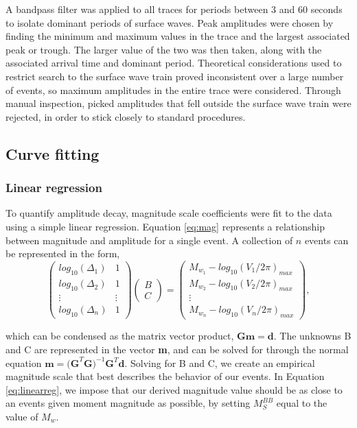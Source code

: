 \documentclass{gji}
\begin{document}
A bandpass filter was applied to all traces for periods between 3 and 60 seconds to isolate dominant periods of surface waves. Peak amplitudes were chosen by finding the minimum and maximum values in the trace and the largest associated peak or trough. The larger value of the two was then taken, along with the associated arrival time and dominant period. Theoretical considerations used to restrict search to the surface wave train proved inconsistent over a large number of events, so maximum amplitudes in the entire trace were considered. Through manual inspection, picked amplitudes that fell outside the surface wave train were rejected, in order to stick closely to standard procedures.

\subsection{Curve fitting}
\subsubsection{Linear regression}
To quantify amplitude decay, magnitude scale coefficients were fit to the data using a simple linear regression. Equation \ref{eq:mag} represents a relationship between magnitude and amplitude for a single event. A collection of $n$ events can be represented in the form, 
\begin{equation}
	\begin{pmatrix}
		log_{10}(\Delta_{1}) & 1 \\
		log_{10}(\Delta_{2}) & 1 \\
		\vdots  & \vdots \\
		log_{10}(\Delta_{n}) & 1 
	\end{pmatrix}
	\begin{pmatrix}
		{B}\\
		{C}
	\end{pmatrix}
	=
	\begin{pmatrix}
		M_{w_1} - log_{10}({V_1}/{2\pi})_{max} \\
		M_{w_2} - log_{10}({V_2}/{2\pi})_{max} \\
		\vdots  \\
		M_{w_n} - log_{10}({V_n}/{2\pi})_{max}
	\end{pmatrix},
	\label{eq:linearreg}
\end{equation}

\noindent which can be condensed as the matrix vector product, $\mathbf{Gm = d}$. The unknowns B and C are represented in the vector {\bfseries m}, and can be solved for through the normal equation $\mathbf{m} = \mathbf{(G}^{T}\mathbf{G})^{-1}\mathbf{G}^T\mathbf{d}$.
Solving for B and C, we create an empirical magnitude scale that best describes the behavior of our events. In Equation \ref{eq:linearreg}, we impose that our derived magnitude value should be as close to an events given moment magnitude as possible, by setting $M_S^{BB}$ equal to the value of $M_w$. 
\end{document}
